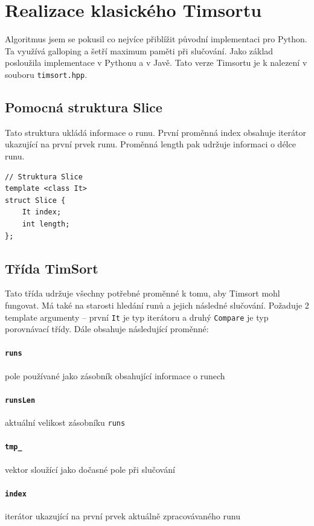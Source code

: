 \documentclass[thesis=B,czech]{FITthesis}[2019/12/23]
\begin{document}
\section{Realizace klasického Timsortu}
Algoritmus jsem se pokusil co nejvíce přiblížit původní implementaci pro Python. Ta využívá galloping a šetří maximum paměti při slučování. Jako základ posloužila implementace v Pythonu\cite{pythonimpl} a v Javě\cite{javaimpl}. Tato verze Timsortu je k nalezení v souboru \texttt{timsort.hpp}.

\subsection{Pomocná struktura Slice}
Tato struktura ukládá informace o runu. První proměnná index obsahuje iterátor ukazující na první prvek runu. Proměnná length pak udržuje informaci o délce runu. 

\begin{verbatim}
// Struktura Slice
template <class It>
struct Slice {
    It index;
    int length;
};
\end{verbatim}

\subsection{Třída TimSort}

Tato třída udržuje všechny potřebné proměnné k tomu, aby Timsort mohl fungovat. Má také na starosti hledání runů a jejich následné slučování. Požaduje 2 template argumenty -- první \texttt{It} je typ iterátoru a druhý \texttt{Compare} je typ porovnávací třídy.
Dále obsahuje následující proměnné:

\paragraph{\texttt{runs}}{pole používané jako zásobník obsahující informace o runech}
\paragraph{\texttt{runsLen}}{aktuální velikost zásobníku \texttt{runs}}
\paragraph{\texttt{tmp\_}}{vektor sloužící jako dočasné pole při slučování}
\paragraph{\texttt{index}}{iterátor ukazující na první prvek aktuálně zpracovávaného runu}
\end{document}
